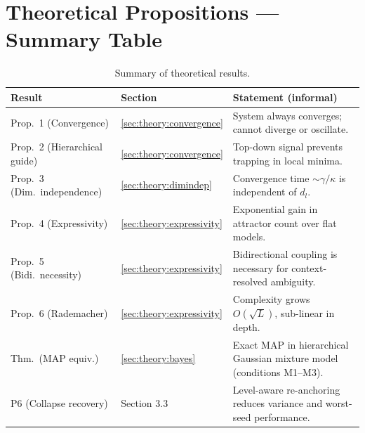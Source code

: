 \documentclass[11pt,a4paper]{article}
\begin{document}
\section{Theoretical Propositions --- Summary Table}

\begin{table}[h]
\centering
\begin{tabular}{llp{7cm}}
\toprule
\textbf{Result} & \textbf{Section} & \textbf{Statement (informal)} \\
\midrule
Prop.~1 (Convergence)        & \ref{sec:theory:convergence} & System always converges; cannot diverge or oscillate. \\
Prop.~2 (Hierarchical guide) & \ref{sec:theory:convergence} & Top-down signal prevents trapping in local minima. \\
Prop.~3 (Dim.\ independence) & \ref{sec:theory:dimindep}    & Convergence time $\sim \gamma/\kappa$ is independent of $d_l$. \\
Prop.~4 (Expressivity)       & \ref{sec:theory:expressivity} & Exponential gain in attractor count over flat models. \\
Prop.~5 (Bidi.\ necessity)   & \ref{sec:theory:expressivity} & Bidirectional coupling is necessary for context-resolved ambiguity. \\
Prop.~6 (Rademacher)         & \ref{sec:theory:expressivity} & Complexity grows $O(\sqrt{L})$, sub-linear in depth. \\
Thm.\ (MAP equiv.)           & \ref{sec:theory:bayes}       & Exact MAP in hierarchical Gaussian mixture model (conditions M1--M3). \\
P6 (Collapse recovery)       & Section 3.3                  & Level-aware re-anchoring reduces variance and worst-seed performance. \\
\bottomrule
\end{tabular}
\caption{Summary of theoretical results.}
\end{table}
\end{document}
